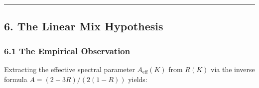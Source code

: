 \documentclass[
  11pt,
]{article}
\begin{document}
\begin{center}\rule{0.5\linewidth}{0.5pt}\end{center}

\newpage

\subsection{6. The Linear Mix Hypothesis}\label{the-linear-mix-hypothesis}

\subsubsection{6.1 The Empirical Observation}\label{the-empirical-observation}

Extracting the effective spectral parameter \(A_{\mathrm{eff}}(K)\) from
\(R(K)\) via the inverse formula \(A = (2 - 3R)/(2(1 - R))\) yields:
\end{document}
